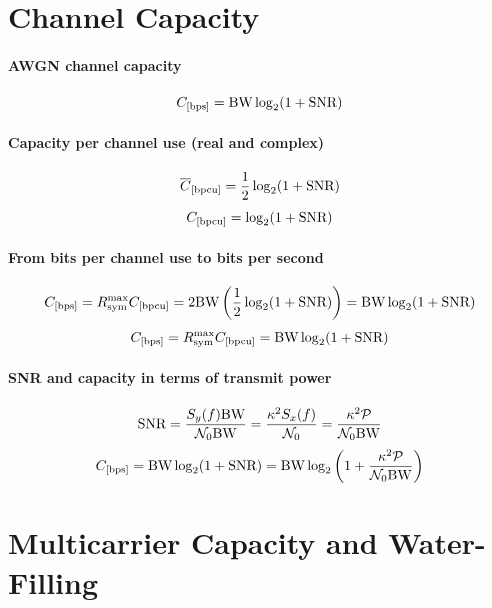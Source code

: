 \section*{Channel Capacity}

\paragraph{AWGN channel capacity}
\begin{equation}
C_{[\textrm{bps}]} = {\textrm{BW}} \log_2 (1 + {\textrm{SNR}})
\label{eq:awgnChannelCapacity}
\end{equation}

\paragraph{Capacity per channel use (real and complex)}
\begin{equation}
\overline C_{[\textrm{bpcu}]} = \frac 1 2 \log_2 (1 + {\textrm{SNR}})
\label{eq:capacityDiscreteAWGN}
\end{equation}
\begin{equation}
C_{[\textrm{bpcu}]} = \log_2 (1 + {\textrm{SNR}})
\label{eq:capacityDiscreteAWGNComplex}
\end{equation}

\paragraph{From bits per channel use to bits per second}
\[
C_{[\textrm{bps}]} = R_{\textrm{sym}}^{\textrm{max}} C_{[\textrm{bpcu}]} = 2 {\textrm{BW}} \left( \frac 1 2 \log_2 (1 + {\textrm{SNR}}) \right) = {\textrm{BW}} \log_2 (1 + {\textrm{SNR}})
\]
\[
C_{[\textrm{bps}]} = R_{\textrm{sym}}^{\textrm{max}} C_{[\textrm{bpcu}]} = {\textrm{BW}} \log_2 (1 + {\textrm{SNR}})
\]

\paragraph{SNR and capacity in terms of transmit power}
\begin{equation}
{\textrm{SNR}} = \frac{S_y(f) {\textrm{BW}}}{ {\cal N}_0 {\textrm{BW}}} = \frac{\kappa^2 S_x(f)}{{\cal N}_0} = \frac{\kappa^2 {\cal P}}{{\cal N}_0 {\textrm{BW}} }
\label{eq:awgnSNRFromTx}
\end{equation}
\begin{equation}
C_{[\textrm{bps}]} = {\textrm{BW}} \log_2 (1 + {\textrm{SNR}}) = {\textrm{BW}} \log_2 \left(1 + \frac{\kappa^2 {\cal P}}{{\cal N}_0 {\textrm{BW}} } \right)
\label{eq:awgnChannelCapacityTransmitPower}
\end{equation}

\section*{Multicarrier Capacity and Water-Filling}

